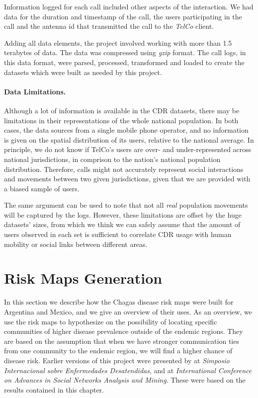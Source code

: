 Information logged for each call included other aspects of the interaction.
We had data for the duration and timestamp of the call, the users participating in the call and the antenna id that transmitted the call to the \emph{TelCo} client.

Adding all data elements, the project involved working with more than 1.5 terabytes of data.
The data was compressed using \emph{gzip} format.
The call logs, in this data format, were parsed, processed, transformed and loaded to create the datasets which were built as needed by this project.

\paragraph{Data Limitations.}
Although a lot of information is available in the CDR datasets, there may be limitations in their representations of the whole national population.
In both cases, the data sources from a single mobile phone operator, and no information is given on the spatial distribution of its users, relative to the national average.
In principle, we do not know if TelCo's users are over- and under-represented across national jurisdictions, in comprison to the nation's national population distribution.
Therefore, calls might not accurately represent social interactions and movements between two given jurisdictions, given that we are provided with a biased sample of users.

The same argument can be used to note that not all \textit{real} population movements will be captured by the logs.
However, these limitations are offset by the huge datasets' sizes, from which we think we can safely assume that the amount of users observed in each set is sufficient to correlate CDR usage with human mobility or social links between different areas.

\section{ Risk Maps Generation}\label{section:risk_maps}

In this section we describe how the Chagas disease risk maps were built for Argentina and Mexico, and we give an overview of their uses.
As an overview, we use the risk maps to hypothesize on the possibility of locating specific communities of higher disease prevalence outside of the endemic regions.
They are based on the assumption that when we have stronger communication ties from one community to the endemic region, we will find a higher chance of disease risk.
Earlier versions of this project were presented by \citep{sarraute2015descubriendo} at \emph{Simposio Internacional sobre Enfermedades Desatendidas}, and\citep{deMonasterio2016analyzing} at \emph{International Conference on Advances in Social Networks Analysis and Mining}.
These were based on the results contained in this chapter.

